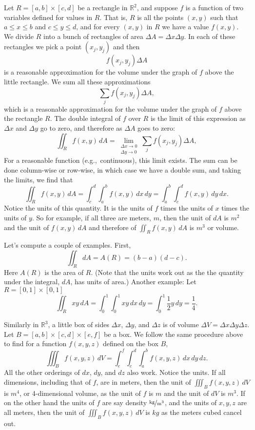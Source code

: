 \documentclass[12pt]{article}
\newcommand{\R}{{\mathbb{R}}}
\begin{document}
Let $R = [a,b] \times [c,d]$ be a rectangle in $\R^2$, and suppose
$f$ is a function of two variables defined for values in $R$.
That is, $R$ is all the points
$(x,y)$ such that $a \leq x \leq b$ and $c \leq y \leq d$,
and for every $(x,y)$ in $R$ we have a value $f(x,y)$.
We divide $R$ into a bunch of rectangles of area $\Delta A = \Delta x \Delta y$.
In each of these rectangles we pick a point $(x_j,y_j)$ and then
\[
f(x_j,y_j) \Delta A
\]
is a reasonable approximation for the volume under the graph of $f$ above the little
rectangle.
We sum all these approximations
\[
\sum_j 
f(x_j,y_j) \Delta A ,
\]
which is a reasonable approximation for the volume under the graph of $f$ above the rectangle
$R$.
The double integral of $f$ over $R$ is the limit of
this expression
as $\Delta x$ and $\Delta y$ go to zero,
and therefore as $\Delta A$ goes to zero:
\[
\iint_R f(x,y) \, dA =
\lim_{\substack{\Delta x \to 0 \\ \Delta y \to 0}}
\sum_j 
f(x_j,y_j) \Delta A ,
\]
For a reasonable function (e.g.,\ continuous), this limit exists.
The sum can be done column-wise or row-wise, in which case we have a
double sum, and taking the limits, we find that
\[
\iint_R f(x,y) \, dA
=
\int_c^d \int_a^b f(x,y) \, dx \, dy
=
\int_a^b \int_c^d f(x,y) \, dy \, dx .
\]
Notice the units of this quantity.  It is the units of $f$ times the units of $x$ times
the units of $y$.  So for example, if all three are meters, $\unit{m}$,
then the unit of $dA$ is $\unit{m^2}$ and
the unit of
$f(x,y) \, dA$
and therefore of
$\iint_R f(x,y) \, dA$
is $\unit{m^3}$ or volume.

Let's compute a couple of examples.
First,
\[
\iint_R dA = A(R) = (b-a)(d-c) .
\]
Here $A(R)$ is the area of $R$.
(Note that the units work out as the 
the quantity under the integral, $dA$, has units of area.)
Another example:  Let $R = [0,1] \times [0,1]$
\[
\iint_R xy\, dA =
\int_0^1 \int_0^1 xy \, dx \, dy
=
\int_0^1 \frac{1}{2} y \, dy
= \frac{1}{4}.
\]

Similarly in $\R^3$, a little box of sides $\Delta x$, $\Delta y$, and $\Delta z$
is of volume $\Delta V = \Delta x \Delta y \Delta z$.  
Let $B = [a,b] \times [c,d] \times [e,f]$ be a box.
We follow the same procedure above to find for a function $f(x,y,z)$
defined on the box $B$,
\[
\iiint_B f(x,y,z) \, dV
=
\int_e^f \int_c^d \int_a^b f(x,y,z) \, dx \, dy \, dz .
\]
All the other orderings of $dx$, $dy$, and $dz$ also work.
Notice the units.  If all dimensions, including that of $f$, are in meters, then
the unit of
$\iiint_B f(x,y,z) \, dV$ is $\unit{m^4}$, or 4-dimensional volume,
as the unit of $f$ is $\unit{m}$ and the unit of $dV$ is $\unit{m^3}$.
If on the other hand the units of $f$ are say density $\unitfrac{kg}{m^3}$,
and the units of $x,y,z$ are all meters,
then the unit of
$\iiint_B f(x,y,z) \, dV$ is $\unit{kg}$ as the meters cubed cancel out.
\end{document}

